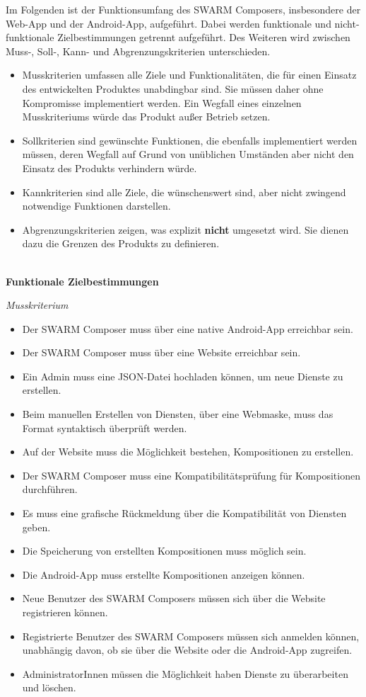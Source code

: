 Im Folgenden ist der Funktionsumfang des SWARM Composers, insbesondere der Web-App und der Android-App, aufgeführt. Dabei werden funktionale und nicht-funktionale Zielbestimmungen getrennt aufgeführt. Des Weiteren wird zwischen Muss-, Soll-, Kann- und Abgrenzungskriterien unterschieden.
%
\begin{itemize}[leftmargin=4pc]
	\item Musskriterien umfassen alle Ziele und Funktionalitäten, die für einen Einsatz des entwickelten Produktes unabdingbar sind.
	Sie müssen daher ohne Kompromisse implementiert werden. Ein Wegfall eines einzelnen Musskriteriums würde das Produkt außer Betrieb setzen.
	\item Sollkriterien sind gewünschte Funktionen, die ebenfalls implementiert werden müssen, deren Wegfall auf Grund von unüblichen Umständen aber nicht den Einsatz des Produkts verhindern würde.
	\item Kannkriterien sind alle Ziele, die wünschenswert sind, aber nicht zwingend notwendige Funktionen darstellen. 
	\item Abgrenzungskriterien zeigen, was explizit \textbf{nicht} umgesetzt wird. Sie dienen dazu die Grenzen des Produkts zu definieren.
	\\\\
\end{itemize}
%

\textbf{Funktionale Zielbestimmungen}\newline
%

\textit{Musskriterium}

\begin{itemize}[leftmargin=4pc]
	\item Der SWARM Composer muss über eine native Android-App erreichbar sein.
	\item Der SWARM Composer muss über eine Website erreichbar sein.
	\item Ein Admin muss eine JSON-Datei hochladen können, um neue Dienste zu erstellen.
	\item Beim manuellen Erstellen von Diensten, über eine Webmaske, muss das Format syntaktisch überprüft werden.
	\item Auf der Website muss die Möglichkeit bestehen, Kompositionen zu erstellen.
	\item Der SWARM Composer muss eine Kompatibilitätsprüfung für Kompositionen durchführen.
	\item Es muss eine grafische Rückmeldung über die Kompatibilität von Diensten geben.
	\item Die Speicherung von erstellten Kompositionen muss möglich sein.
	\item Die Android-App muss erstellte Kompositionen anzeigen können.
	\item Neue Benutzer des SWARM Composers müssen sich über die Website registrieren können.
	\item Registrierte Benutzer des SWARM Composers müssen sich anmelden können, unabhängig davon, ob sie über die Website oder die Android-App zugreifen.
	\item AdministratorInnen müssen die Möglichkeit haben Dienste zu überarbeiten und löschen.
\end{itemize}

